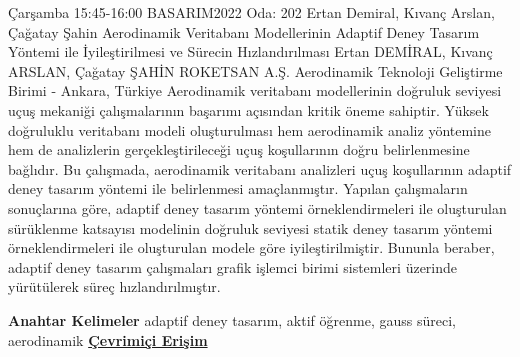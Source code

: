 
    \begin{abstract_basarim}
    {Çarşamba 15:45-16:00}
    {BASARIM2022}
    {Oda: 202}
    {Ertan Demiral, Kıvanç Arslan, Çağatay Şahin}
    {Aerodinamik Veritabanı Modellerinin Adaptif Deney Tasarım Yöntemi ile İyileştirilmesi ve Sürecin Hızlandırılması}
    {%
    Ertan DEMİRAL, Kıvanç ARSLAN, Çağatay ŞAHİN}
    {%
    }
    {%
    ROKETSAN A.Ş. Aerodinamik Teknoloji Geliştirme Birimi - Ankara, Türkiye}
    Aerodinamik veritabanı modellerinin doğruluk seviyesi uçuş mekaniği çalışmalarının başarımı açısından kritik öneme sahiptir. Yüksek doğruluklu veritabanı modeli oluşturulması hem aerodinamik analiz yöntemine hem de analizlerin gerçekleştirileceği uçuş koşullarının doğru belirlenmesine bağlıdır. Bu çalışmada, aerodinamik veritabanı analizleri uçuş koşullarının adaptif deney tasarım yöntemi ile belirlenmesi amaçlanmıştır. Yapılan çalışmaların sonuçlarına göre, adaptif deney tasarım yöntemi örneklendirmeleri ile oluşturulan sürüklenme katsayısı modelinin doğruluk seviyesi statik deney tasarım yöntemi örneklendirmeleri ile oluşturulan modele göre iyileştirilmiştir. Bununla beraber, adaptif deney tasarım çalışmaları grafik işlemci birimi sistemleri üzerinde yürütülerek süreç hızlandırılmıştır. 
    
            \textbf{Anahtar Kelimeler} \newline{}adaptif deney tasarım, aktif öğrenme, gauss süreci, aerodinamik
     \newline\newline\noindent \href{https://drive.google.com/file/d/1pF5rZu-6ELVj9ZsweeLNf2EtRDMu29VK/view?usp=sharing}{\bfseries Çevrimiçi Erişim}
    \end{abstract_basarim}
    